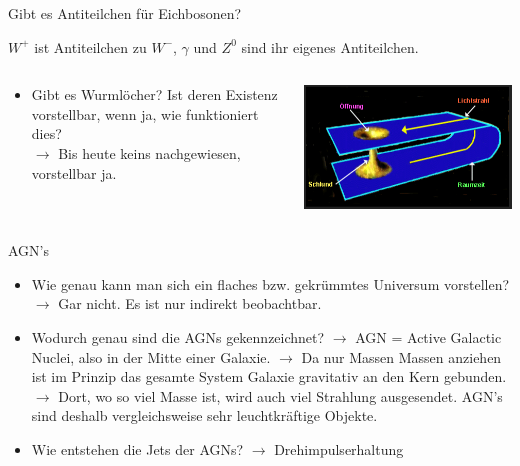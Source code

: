 \begin{frame}{Gibt es Antiteilchen für Eichbosonen?}

$W^+$ ist Antiteilchen zu $W^-$, $\gamma$ und $Z^0$ sind ihr eigenes Antiteilchen.

\vspace{0.5cm}

\begin{columns}[T, onlytextwidth]
  \begin{column}{0.47\textwidth}
    \begin{itemize}
      \setlength\itemsep{2em}
      \item Gibt es Wurmlöcher? Ist deren Existenz vorstellbar, wenn ja, wie funktioniert dies? \\
      $\longrightarrow$ Bis heute keins nachgewiesen, vorstellbar ja.
    \end{itemize}
  \end{column}
  \hfill
  \begin{column}{0.47\textwidth}
    \includegraphics[width=\textwidth]{images/Frage2.PNG}
  \end{column}
\end{columns}


\end{frame}

\begin{frame}{AGN's}
\begin{itemize}
  \setlength\itemsep{2em}
  \item Wie genau kann man sich ein flaches bzw. gekrümmtes Universum vorstellen?
  $\longrightarrow$ Gar nicht. Es ist nur indirekt beobachtbar.
  \item Wodurch genau sind die AGNs gekennzeichnet?
  $\longrightarrow$ AGN = Active Galactic Nuclei, also in der Mitte einer Galaxie.
  $\longrightarrow$ Da nur Massen Massen anziehen ist im Prinzip das gesamte
  System Galaxie gravitativ an den Kern gebunden.
  $\longrightarrow$ Dort, wo so viel Masse ist, wird auch viel Strahlung
  ausgesendet. AGN's sind deshalb vergleichsweise sehr leuchtkräftige Objekte.
  \item Wie entstehen die Jets der AGNs?
  $\longrightarrow$ Drehimpulserhaltung
\end{itemize}
\end{frame}

